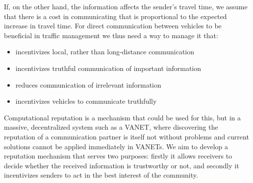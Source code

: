\documentclass{article}
\begin{document}
If, on the other hand, the information affects the sender's travel time,  we assume that there is a cost in communicating that is proportional to the expected increase in travel time. For direct communication between vehicles to be beneficial in traffic management we thus need a way to manage it that:
\begin{itemize}
  \item incentivizes local, rather than long-distance communication
  \item incentivizes truthful communication of important information
  \item reduces communication of irrelevant information
  \item incentivizes vehicles to communicate truthfully
\end{itemize}

Computational reputation is a mechanism that could be used for this, but in a massive, decentralized system such as a VANET, where discovering the reputation of a communication partner is itself not without problems \cite{Zhang2011} and current solutions cannot be applied immediately in VANETs. We aim to develop a reputation mechanism that serves two purposes: firstly it allows receivers to decide whether the received information is trustworthy or not, and secondly it incentivizes senders to act in the best interest of the community. 
\end{document}

